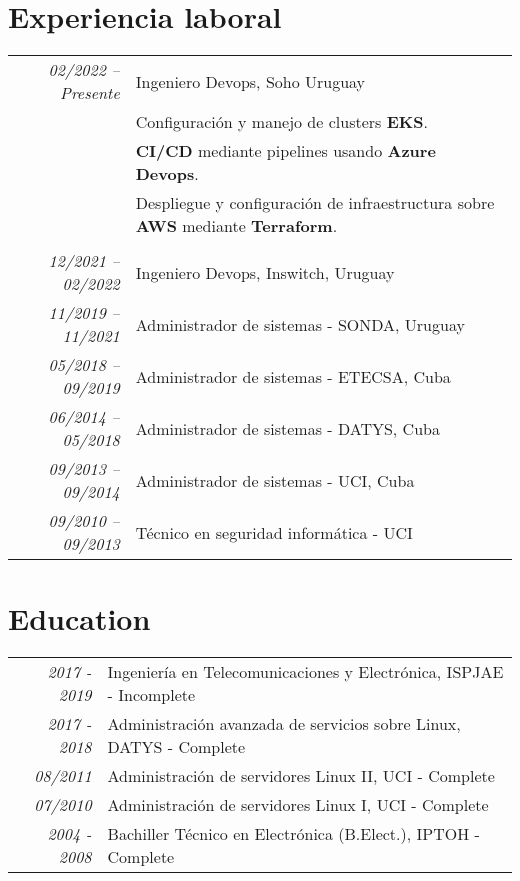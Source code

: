 \documentclass[a4paper,10pt]{article}
\begin{document}
\section{Experiencia laboral}
\begin{tabular}{r|p{11cm}}
\emph{02/2022 – Presente } & Ingeniero Devops, Soho Uruguay \\
	
\textsc{}&\footnotesize{Configuraci\'on y manejo de clusters \textbf{EKS}.}\\&
\footnotesize{\textbf{CI/CD} mediante pipelines usando \textbf{Azure Devops}.}\\&
\footnotesize{Despliegue y configuraci\'on de infraestructura sobre \textbf{AWS} mediante \textbf{Terraform}.}\\
	
\multicolumn{2}{c}{} \\	
\emph{12/2021 – 02/2022 } & Ingeniero Devops, Inswitch, Uruguay \\
\emph{11/2019 – 11/2021} & Administrador de sistemas - SONDA, Uruguay \\
\emph{05/2018 – 09/2019} & Administrador de sistemas - ETECSA, Cuba \\
\emph{06/2014 – 05/2018} & Administrador de sistemas - DATYS, Cuba \\
\emph{09/2013 – 09/2014} & Administrador de sistemas - UCI, Cuba \\
\emph{09/2010 – 09/2013} & T\'ecnico en seguridad inform\'atica - UCI \\
\end{tabular}

\section{Education}
\begin{tabular}{r|p{11cm}}
	\emph{2017 - 2019}  &Ingenier\'ia en Telecomunicaciones y Electrónica, ISPJAE - Incomplete \\
	\emph{2017 - 2018}  & Administraci\'on avanzada de servicios sobre Linux, DATYS - Complete \\
	\emph{08/2011}  & Administraci\'on de servidores Linux II, UCI - Complete \\
	\emph{07/2010}  & Administraci\'on de servidores Linux I, UCI - Complete \\
	\emph{2004 - 2008}  & Bachiller T\'ecnico en Electr\'onica (B.Elect.), IPTOH - Complete \\
\end{tabular}
\end{document}
